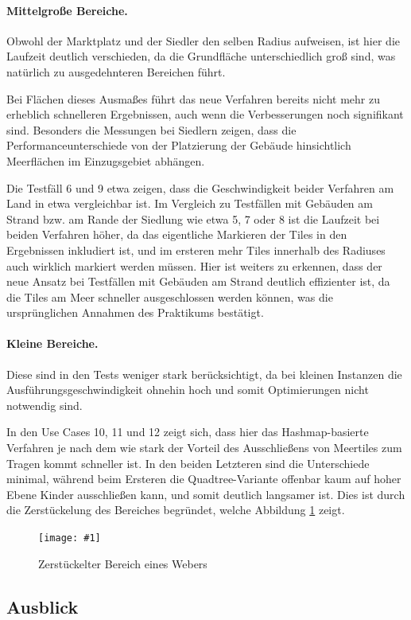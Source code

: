 \documentclass[%
			paper=a4,%
			DIV12,
			liststotoc,
			bibtotoc,
			draft=false,%
			titlepage,
			numbers=noendperiod
			]{scrartcl}
\newcommand{\myfig}[5] {
 \begin{figure}[tbph]
	 \centering
	 \texttt{[image: \#1]}
	 \caption[#4]{#5}
	 \label{fig:#2}
 \end{figure}
}
\begin{document}
\paragraph{Mittelgroße Bereiche.}
Obwohl der Marktplatz und der Siedler den selben Radius aufweisen, ist hier die Laufzeit deutlich verschieden, da die Grundfläche unterschiedlich groß sind, was natürlich zu ausgedehnteren Bereichen führt.

Bei Flächen dieses Ausmaßes führt das neue Verfahren bereits nicht mehr zu erheblich schnelleren Ergebnissen, auch wenn die Verbesserungen noch signifikant sind.
Besonders die Messungen bei Siedlern zeigen, dass die Performanceunterschiede von der Platzierung der Gebäude hinsichtlich Meerflächen im Einzugsgebiet abhängen.

Die Testfäll 6 und 9 etwa zeigen, dass die Geschwindigkeit beider Verfahren am Land in etwa vergleichbar ist.
Im Vergleich zu Testfällen mit Gebäuden am Strand bzw. am Rande der Siedlung wie etwa 5, 7 oder 8 ist die Laufzeit bei beiden Verfahren höher, da das eigentliche Markieren der Tiles in den Ergebnissen inkludiert ist, und im ersteren mehr Tiles innerhalb des Radiuses auch wirklich markiert werden müssen.
Hier ist weiters zu erkennen, dass der neue Ansatz bei Testfällen mit Gebäuden am Strand deutlich effizienter ist, da die Tiles am Meer schneller ausgeschlossen werden können, was die ursprünglichen Annahmen des Praktikums bestätigt.

\paragraph{Kleine Bereiche.}
Diese sind in den Tests weniger stark berücksichtigt, da bei kleinen Instanzen die Ausführungsgeschwindigkeit ohnehin hoch und somit Optimierungen nicht notwendig sind.

In den Use Cases 10, 11 und 12 zeigt sich, dass hier das Hashmap-basierte Verfahren je nach dem wie stark der Vorteil des Ausschließens von Meertiles zum Tragen kommt schneller ist.
In den beiden Letzteren sind die Unterschiede minimal, während beim Ersteren die Quadtree-Variante offenbar kaum auf hoher Ebene Kinder ausschließen kann, und somit deutlich langsamer ist. 
Dies ist durch die Zerstückelung des Bereiches begründet, welche Abbildung \ref{fig:weaver} zeigt.

\myfig{img/weaver}{weaver}{width=.6\textwidth}{Zerstückelter Bereich eines Webers}{Zerstückelter Bereich eines Webers}


\subsection{Ausblick}
\end{document}
